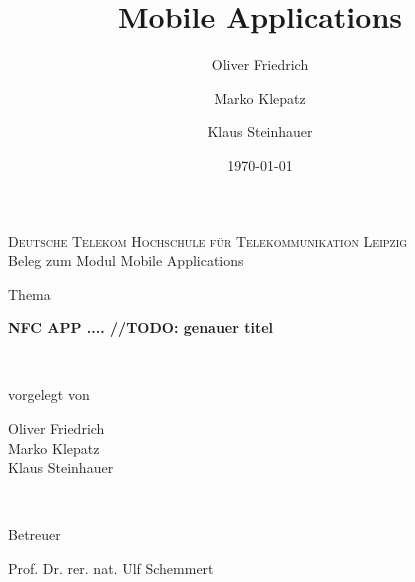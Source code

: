 \documentclass[a4paper,ngerman,12pt]{scrreprt}
\title{Mobile Applications}
\author{
	Oliver Friedrich
	\and Marko Klepatz
	\and Klaus Steinhauer
    }
\date{\today}
\begin{document}
\begin{titlepage}
	\begin{center}
	
	\textsc{\large Deutsche Telekom Hochschule für Telekommunikation Leipzig}
	\\[2cm]
	{\Large Beleg zum Modul Mobile Applications}
	\\[1cm]
		\begin{minipage}{0.2\textwidth}
		\begin{flushleft}
		{\footnotesize Thema}
		\end{flushleft}
		\end{minipage}
		 \hfill
		\begin{minipage}{0.75\textwidth}
		\begin{flushleft}
		\textbf{{\Large NFC APP .... //TODO: genauer titel}}
		\end{flushleft}
		 \end{minipage}
		\\[2cm]
		\begin{minipage}{0.2\textwidth}
		\begin{flushleft}
		{\footnotesize vorgelegt von}
		\end{flushleft}
		\end{minipage}
		 \hfill
		\begin{minipage}{0.75\textwidth}
		\begin{flushleft}
		{\normalsize
			Oliver Friedrich
			\\Marko Klepatz
			\\Klaus Steinhauer}
		\end{flushleft}
		 \end{minipage}
		 \\[2cm]
		 \begin{minipage}{0.2\textwidth}
		 \begin{flushleft}
		 {\footnotesize Betreuer}
		 \end{flushleft}
		 \end{minipage}
	  \hfill
	   \begin{minipage}{0.75\textwidth}
	  		 \begin{flushleft}
	  		 {\normalsize
	  		 		Prof. Dr. rer. nat. Ulf Schemmert
	  		 }
	  		 \end{flushleft}
	  		  \end{minipage}
	  		  \vfill
	 \renewcommand*{\dictumwidth}{.6\textwidth}
	
	\end{center}
\end{titlepage}
\end{document}
